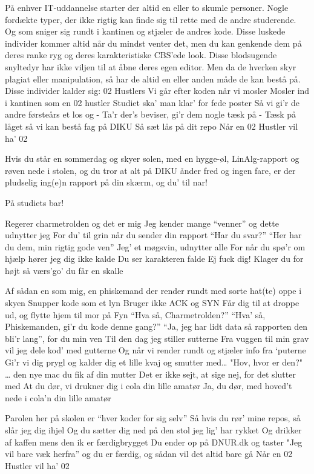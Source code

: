 \documentclass[a4paper,11pt]{article}
\begin{document}
\begin{song}
 På enhver IT-uddannelse starter der altid en eller to skumle personer. Nogle fordækte typer, der ikke rigtig kan finde sig til rette med de andre studerende. Og som sniger sig rundt i kantinen og stjæler de andres kode. 
Disse luskede individer kommer altid når du mindst venter det, men du kan genkende dem på deres ranke ryg og deres karakteristiske CBS’ede look. 
Disse blodsugende snyltedyr har ikke viljen til at åbne deres egen editor. Men da de hverken skyr plagiat eller manipulation, så har de altid en eller anden måde de kan bestå på.
Disse individer kalder sig: 02 Hustlers
 Vi går efter koden når vi mosler
 Mosler ind i kantinen som en 02 hustler
Studiet ska’ man klar’ for fede poster 
Så vi gi’r de andre førsteårs et los og -
 Ta’r der’s beviser, gi’r dem nogle tæsk på - 
 Tæsk på låget så vi kan bestå fag på DIKU
 Så sæt lås på dit repo
 Når en 02 Hustler vil ha’ 02

 Hvis du står en sommerdag og skyer solen, med en hygge-øl, LinAlg-rapport og røven nede i stolen,
og du tror at alt på DIKU ånder fred og ingen fare,
er der pludselig ing(e)n rapport på din skærm, og du’ til nar!

 På studiets bar!

 Regerer charmetrolden og det er mig
Jeg kender mange “venner” og dette udnytter jeg
For du’ til grin når du sender din rapport
“Har du svar?” 
 “Her har du dem, min rigtig gode ven” 
Jeg’ et møgsvin, udnytter alle
For når du spø’r om hjælp hører jeg dig ikke kalde
Du ser karakteren falde
 Ej fuck dig!
Klager du for højt så værs’go’ du får en skalle 

 Af sådan en som mig, en phiskemand der render rundt med sorte hat(te) oppe i skyen
Snupper kode som et lyn
Bruger ikke ACK og SYN
Får dig til at droppe ud, og flytte hjem til mor på Fyn
“Hva så, Charmetrolden?”
 “Hva' så, Phiskemanden, gi’r du kode denne gang?” 
 “Ja, jeg har lidt data så rapporten den bli’r lang”,  for du min ven
Til den dag jeg stiller sutterne 
Fra vuggen til min grav vil jeg dele kod’ med gutterne
 Og når vi render rundt og stjæler info fra ‘puterne
 Gi’r vi dig prygl og kalder dig et lille kvaj og smutter med…
 "Hov, hvor er den?"
… den nye mac du fik af din mutter
Det er ikke sejt, at sige nej, for det slutter med
 At du dør, vi drukner dig i cola din lille amatør
Ja, du dør, med hoved’t nede i cola’n din lille amatør

Parolen her på skolen er “hver koder for sig selv”
Så hvis du rør’ mine repos, så slår jeg dig ihjel
 Og du sætter dig ned på den stol jeg lig’ har rykket
Og drikker af kaffen mens den ik er færdigbrygget
Du ender op på DNUR.dk og taster
"Jeg vil bare væk herfra”
og du er færdig, og sådan vil det altid bare gå
Når en 02 Hustler vil ha’ 02

\end{song}
\end{document}
